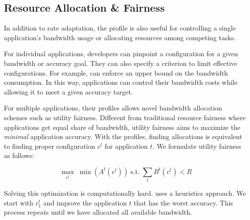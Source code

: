 \subsection{Resource Allocation \& Fairness}

In addition to rate adaptation, the profile is also useful for controlling a
single application's bandwidth usage or allocating resources among competing
tasks.

For individual applications, developers can pinpoint a configuration for a given
bandwidth or accuracy goal. They can also specify a criterion to limit effective
configurations. For example, \sysname{} can enforce an upper bound on the
bandwidth consumption. In this way, applications can control their bandwidth
costs while allowing it to meet a given accuracy target.

For multiple applications, their profiles allows novel bandwidth allocation
schemes such as utility fairness. Different from traditional resource fairness
where applications get equal share of bandwidth, utility fairness aims
to maximize the \textit{minimal} application accuracy. With the profiles,
finding allocations is equivalent to finding proper configuration $c^t$ for
application $t$. We formulate utility fairness as follows:


\begin{equation}
 \label{eq:multitask}
 \underset{c^t}{\max} \; \min({A^t(c^t)})
 \;
 \text{s.t.}
 \;
 \sum_t{B^t(c^t)} < R
\end{equation}


Solving this optimization is computationally hard. \sysname{} uses a heuristics
approach. We start with $c_1^t$ and improve the application $t$ that has the
worst accuracy. This process repeats until we have allocated all available
bandwidth.

